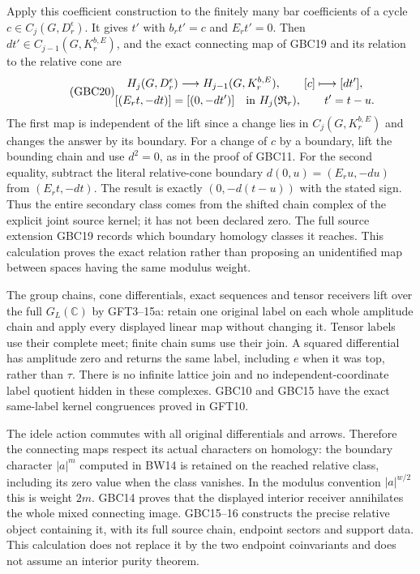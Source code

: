 Apply this coefficient construction to the finitely many bar
coefficients of a cycle $c\in C_j(G,D_r^\epsilon)$.
It gives $t'$ with $b_rt'=c$ and $E_rt'=0$.
Then $dt'\in C_{j-1}(G,K_r^{b,E})$, and the exact connecting
map of GBC19 and its relation to the relative cone are
\begin{equation}\tag{GBC20}
 \begin{gathered}
 H_j(G,D_r^\epsilon)\longrightarrow
              H_{j-1}(G,K_r^{b,E}),\qquad[c]\longmapsto[dt'],\\
 [(E_rt,-dt)]=[(0,-dt')]
                    \quad\hbox{in }H_j(\mathfrak R_r),\qquad t'=t-u.
 \end{gathered}
\end{equation}
The first map is independent of the lift since a change lies
in $C_j(G,K_r^{b,E})$ and changes the answer by its boundary.
For a change of $c$ by a boundary, lift the bounding chain and
use $d^2=0$, as in the proof of GBC11. For the second equality,
subtract the literal relative-cone boundary
$d(0,u)=(E_ru,-du)$ from $(E_rt,-dt)$.
The result is exactly $(0,-d(t-u))$ with the stated sign.
Thus the entire secondary class comes from the shifted chain
complex of the explicit joint source kernel; it has not been
declared zero. The full source extension GBC19 records which
boundary homology classes it reaches. This calculation proves
the exact relation rather than proposing an unidentified map
between spaces having the same modulus weight.

The group chains, cone differentials, exact sequences and tensor
receivers lift over the full $G_L(\mathbb C)$ by GFT3--15a:
retain one original label on each whole amplitude chain and apply
every displayed linear map without changing it. Tensor labels
use their complete meet; finite chain sums use their join.
A squared differential has amplitude zero and returns the same
label, including $e$ when it was top, rather than $\tau$.
There is no infinite lattice join and no independent-coordinate
label quotient hidden in these complexes. GBC10 and GBC15 have
the exact same-label kernel congruences proved in GFT10.

The idele action commutes with all original differentials and
arrows. Therefore the connecting maps respect its actual
characters on homology: the boundary character $|a|^m$ computed
in BW14 is retained on the reached relative class, including
its zero value when the class vanishes. In the modulus convention
$|a|^{w/2}$ this is weight $2m$. GBC14 proves that the displayed
interior receiver annihilates the whole mixed connecting image.
GBC15--16 constructs the precise relative object containing it,
with its full source chain, endpoint sectors and support data.
This calculation does not replace it by the two endpoint
coinvariants and does not assume an interior purity theorem.
